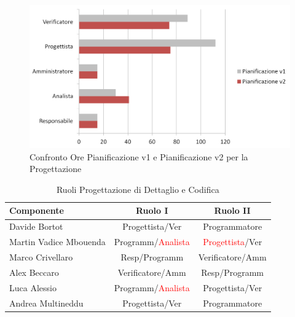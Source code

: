 \documentclass[a4paper,11pt]{article}
\begin{document}
		\begin{figure}[h!]
		    \centering
			\includegraphics[scale=0.7]{../Images/chart-Confronto_Pianificazioni1vs2_Progettazione.png}
			\caption{Confronto Ore Pianificazione v1 e Pianificazione v2 per la Progettazione}
		\end{figure}	
		\clearpage
		
		\begin{table}[h!]			
		\begin{center}
			\begin{tabular}{l c c}
			\textbf{Componente} & \textbf{Ruolo I} & \textbf{Ruolo II} \\
			\midrule
			Davide Bortot & Progettista/Ver & Programmatore\\
			Martin Vadice Mbouenda & Programm/\textcolor{red}{Analista} & \textcolor{red}{Progettista}/Ver\\
			Marco Crivellaro & Resp/Programm & Verificatore/Amm\\
			Alex Beccaro & Verificatore/Amm & Resp/Programm\\
			Luca Alessio & Programm/\textcolor{red}{Analista} & Progettista/Ver\\
			Andrea Multineddu & Progettista/Ver & Programmatore\\
			\midrule
			\end{tabular}
		\end{center}
		\caption{Ruoli Progettazione di Dettaglio e Codifica}
		\end{table}
		
\end{document}
